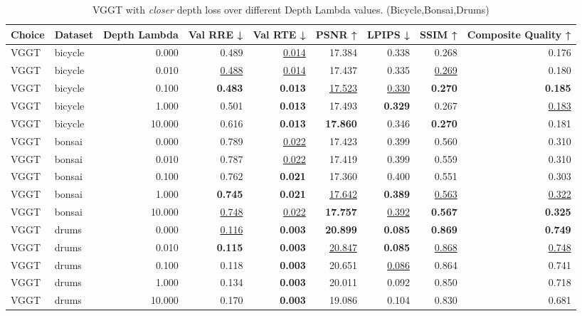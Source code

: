 \begin{table}[H]
\caption{\ifdefined\customcaption \customcaption \else VGGT with \textit{closer} depth loss over different Depth Lambda values. (Bicycle,Bonsai,Drums) \fi}
\label{tab:05_depth_lambda_bicycle,bonsai,drums}
\centering
\scriptsize
\begin{tabular}{llrrrrrrr}
\toprule
Choice & Dataset & Depth Lambda & Val RRE ↓ & Val RTE ↓ & PSNR ↑ & LPIPS ↓ & SSIM ↑ & Composite Quality ↑ \\
\midrule
VGGT & bicycle & 0.000 & 0.489 & \underline{0.014} & 17.384 & 0.338 & 0.268 & 0.176 \\
VGGT & bicycle & 0.010 & \underline{0.488} & \underline{0.014} & 17.437 & 0.335 & \underline{0.269} & 0.180 \\
VGGT & bicycle & 0.100 & \textbf{0.483} & \textbf{0.013} & \underline{17.523} & \underline{0.330} & \textbf{0.270} & \textbf{0.185} \\
VGGT & bicycle & 1.000 & 0.501 & \textbf{0.013} & 17.493 & \textbf{0.329} & 0.267 & \underline{0.183} \\
VGGT & bicycle & 10.000 & 0.616 & \textbf{0.013} & \textbf{17.860} & 0.346 & \textbf{0.270} & 0.181 \\
\midrule
VGGT & bonsai & 0.000 & 0.789 & \underline{0.022} & 17.423 & 0.399 & 0.560 & 0.310 \\
VGGT & bonsai & 0.010 & 0.787 & \underline{0.022} & 17.419 & 0.399 & 0.559 & 0.310 \\
VGGT & bonsai & 0.100 & 0.762 & \textbf{0.021} & 17.360 & 0.400 & 0.551 & 0.303 \\
VGGT & bonsai & 1.000 & \textbf{0.745} & \textbf{0.021} & \underline{17.642} & \textbf{0.389} & \underline{0.563} & \underline{0.322} \\
VGGT & bonsai & 10.000 & \underline{0.748} & \underline{0.022} & \textbf{17.757} & \underline{0.392} & \textbf{0.567} & \textbf{0.325} \\
\midrule
VGGT & drums & 0.000 & \underline{0.116} & \textbf{0.003} & \textbf{20.899} & \textbf{0.085} & \textbf{0.869} & \textbf{0.749} \\
VGGT & drums & 0.010 & \textbf{0.115} & \textbf{0.003} & \underline{20.847} & \textbf{0.085} & \underline{0.868} & \underline{0.748} \\
VGGT & drums & 0.100 & 0.118 & \textbf{0.003} & 20.651 & \underline{0.086} & 0.864 & 0.741 \\
VGGT & drums & 1.000 & 0.134 & \textbf{0.003} & 20.011 & 0.092 & 0.850 & 0.718 \\
VGGT & drums & 10.000 & 0.170 & \textbf{0.003} & 19.086 & 0.104 & 0.830 & 0.681 \\
\bottomrule
\end{tabular}
\end{table}